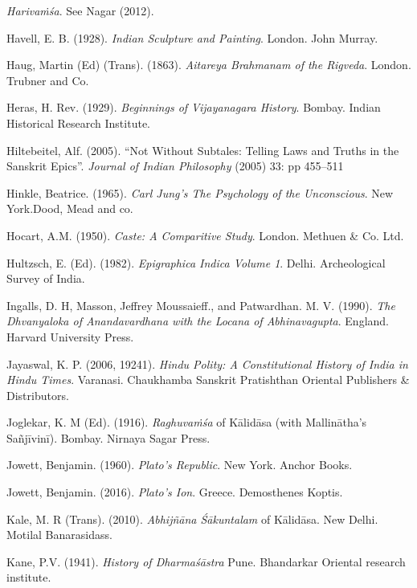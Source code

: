 \begin{thebibliography}{99}
{\sl Harivaṁśa}. See Nagar (2012). 

Havell, E. B. (1928). {\sl Indian Sculpture and Painting}. London. John Murray. 

Haug, Martin (Ed) (Trans). (1863). {\sl Aitareya Brahmanam of the Rigveda}. London. Trubner and Co. 

Heras, H. Rev. (1929). {\sl Beginnings of Vijayanagara History}. Bombay. Indian Historical Research Institute. 

Hiltebeitel, Alf. (2005). “Not Without Subtales: Telling Laws and Truths in the Sanskrit Epics”. {\sl Journal 
of Indian Philosophy} (2005) 33: pp 455–511

Hinkle, Beatrice. (1965). {\sl Carl Jung’s The Psychology of the Unconscious}. New York.Dood, Mead and co. 

Hocart, A.M. (1950). {\sl Caste: A Comparitive Study}. London. Methuen \& Co. Ltd. 

Hultzsch, E. (Ed). (1982). {\sl Epigraphica Indica Volume 1}. Delhi. Archeological Survey of India. 

Ingalls, D. H,  Masson, Jeffrey Moussaieff., and Patwardhan. M. V. (1990). {\sl The Dhvanyaloka of 
Anandavardhana with the Locana of Abhinavagupta}. England. Harvard University Press. 

Jayaswal, K. P. (2006, 19241). {\sl Hindu Polity: A Constitutional History of India in Hindu Times}. Varanasi. Chaukhamba Sanskrit Pratishthan Oriental Publishers \& Distributors. 

Joglekar, K. M (Ed). (1916). {\sl Raghuvaṁśa} of Kālidāsa (with Mallinātha’s Sañjīvinī). Bombay. Nirnaya Sagar Press.  

Jowett, Benjamin. (1960). {\sl Plato’s Republic}. New York. Anchor Books. 

Jowett, Benjamin. (2016). {\sl Plato’s Ion}. Greece. Demosthenes Koptis. 

Kale, M. R (Trans). (2010). {\sl Abhijñāna Śākuntalam} of Kālidāsa. New Delhi. Motilal Banarasidass. 

Kane, P.V. (1941). {\sl History of Dharmaśāstra} Pune. Bhandarkar Oriental research institute. 


\end{thebibliography}
